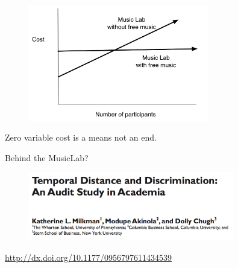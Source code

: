 \documentclass[aspectratio=169]{beamer}
\def\vf{\vfill}
\begin{document}
\begin{frame}

\begin{figure}
  \centering
  \includegraphics[width=0.7\textwidth]{figures/zero_variable_cost_experiments_musiclab}
\end{figure}

\vf
\pause
\Large{Zero variable cost is a means not an end.}

\end{frame}
\begin{frame}

{\Large
\begin{center}
Behind the MusicLab?
\end{center}
}

\end{frame}
\begin{frame}

\begin{figure}
  \centering
  \includegraphics[width=0.8\textwidth]{figures/milkman_temporal_2012_title.png}
\end{figure}

\vf
\tiny{\url{http://dx.doi.org/10.1177/0956797611434539}}

\end{frame}
\end{document}

